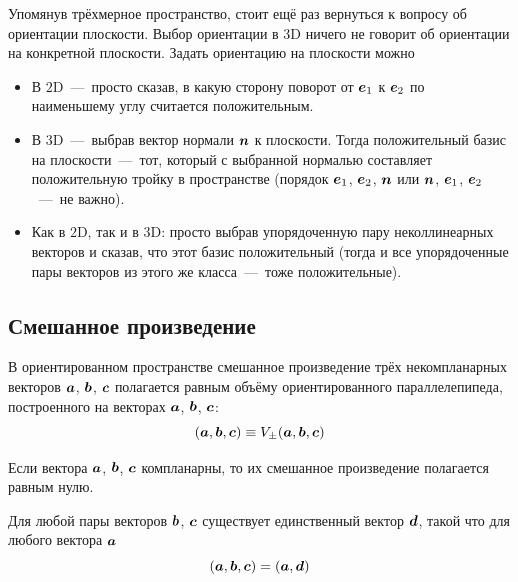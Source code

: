 \documentclass[a4paper,12pt]{article}
\begin{document}
  Упомянув трёхмерное пространство, стоит ещё раз вернуться к вопросу об ориентации плоскости.
  Выбор ориентации в $3$D ничего не говорит об ориентации на конкретной плоскости.
  Задать ориентацию на плоскости можно
  \begin{itemize}
    \item В $2$D~---~просто сказав, в какую сторону поворот от $\boldsymbol e_1$ к $\boldsymbol e_2$ по наименьшему углу считается положительным.
    
    \item В $3$D~---~выбрав вектор нормали $\boldsymbol n$ к плоскости.
    Тогда положительный базис на плоскости~---~тот, который с выбранной нормалью составляет положительную тройку в пространстве (порядок $\boldsymbol e_1$, $\boldsymbol e_2$, $\boldsymbol n$ или $\boldsymbol n$, $\boldsymbol e_1$, $\boldsymbol e_2$~---~не важно).
    
    \item Как в $2$D, так и в $3$D: просто выбрав упорядоченную пару неколлинеарных векторов и сказав, что этот базис положительный (тогда и все упорядоченные пары векторов из этого же класса~---~тоже положительные).
  \end{itemize}

  
  \subsection{Смешанное произведение}
  
  \begin{definition}
    В ориентированном пространстве смешанное произведение трёх некомпланарных векторов $\boldsymbol a$, $\boldsymbol b$, $\boldsymbol c$ полагается равным объёму ориентированного параллелепипеда, построенного на векторах $\boldsymbol a$, $\boldsymbol b$, $\boldsymbol c$:
    \[
      (\boldsymbol a, \boldsymbol b, \boldsymbol c) \equiv V_{\pm}(\boldsymbol a, \boldsymbol b, \boldsymbol c)
    \]
    
    Если вектора $\boldsymbol a$, $\boldsymbol b$, $\boldsymbol c$ компланарны, то их смешанное произведение полагается равным нулю.
  \end{definition}
  
  \begin{theorem}
    Для любой пары векторов $\boldsymbol b$, $\boldsymbol c$ существует единственный вектор $\boldsymbol d$, такой что для любого вектора $\boldsymbol a$
    \[
      (\boldsymbol a, \boldsymbol b, \boldsymbol c) = (\boldsymbol a, \boldsymbol d)
    \]
  \end{theorem}
  
\end{document}
